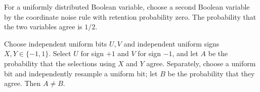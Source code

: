 \begin{theorem}
\label{FABL.productBoolAgreementAtZero_eq_one_half}
\leanok
{}
For a uniformly distributed Boolean variable, choose a second Boolean variable by the
coordinate noise rule with retention probability zero. The probability that the two
variables agree is $1/2$.
\end{theorem}

\begin{theorem}
\label{FABL.printed_product_selector_coupling_false}
\leanok
{}
Choose independent uniform bits $U,V$ and independent uniform signs $X,Y\in\{-1,1\}$.
Select $U$ for sign $+1$ and $V$ for sign $-1$, and let $A$ be the probability that the
selections using $X$ and $Y$ agree. Separately, choose a uniform bit and independently
resample a uniform bit; let $B$ be the probability that they agree. Then $A\ne B$.
\end{theorem}
